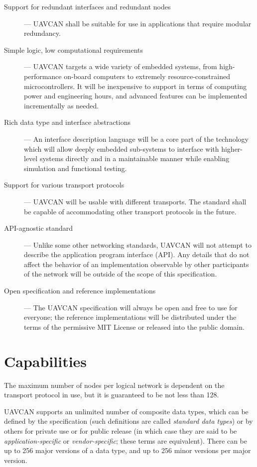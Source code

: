 \begin{description}
    \item[Support for redundant interfaces and redundant nodes] --- UAVCAN shall be suitable for use in
    applications that require modular redundancy.

    \item[Simple logic, low computational requirements] --- UAVCAN targets a wide variety of embedded systems,
    from high-performance on-board computers to extremely resource-constrained microcontrollers.
    It will be inexpensive to support in terms of computing power and engineering hours,
    and advanced features can be implemented incrementally as needed.

    \item[Rich data type and interface abstractions] --- An interface description language will be a core part of
    the technology which will allow deeply embedded sub-systems to interface with higher-level systems directly and
    in a maintainable manner while enabling simulation and functional testing.

    \item[Support for various transport protocols] --- UAVCAN will be usable with different transports.
    The standard shall be capable of accommodating other transport protocols in the future.

    \item[API-agnostic standard] --- Unlike some other networking standards, UAVCAN will not attempt to describe
    the application program interface (API). Any details that do not affect the behavior of an implementation
    observable by other participants of the network will be outside of the scope of this specification.

    \item[Open specification and reference implementations] --- The UAVCAN specification will always be open and
    free to use for everyone; the reference implementations will be distributed under the terms of
    the permissive MIT License or released into the public domain.
\end{description}

\section{Capabilities}

The maximum number of nodes per logical network is dependent on the transport protocol in use,
but it is guaranteed to be not less than 128.

UAVCAN supports an unlimited number of composite data types,
which can be defined by the specification (such definitions are called \emph{standard data types})
or by others for private use or for public release
(in which case they are said to be \emph{application-specific} or \emph{vendor-specific}; these terms are equivalent).
There can be up to 256 major versions of a data type, and up to 256 minor versions per major version.

